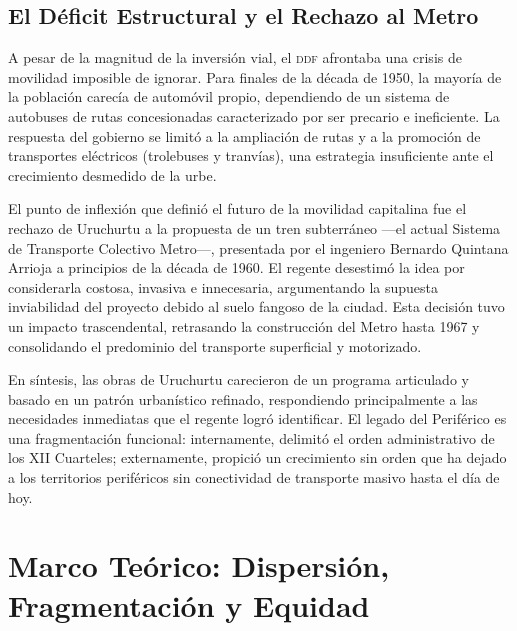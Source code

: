 \subsection{El Déficit Estructural y el Rechazo al Metro}
\label{subsec:rechazo-metro}

A pesar de la magnitud de la inversión vial, el \textsc{ddf} afrontaba una crisis de
movilidad imposible de ignorar. Para finales de la década de 1950, la mayoría de la
población carecía de automóvil propio, dependiendo de un sistema de autobuses de
rutas concesionadas caracterizado por ser precario e ineficiente. La respuesta del
gobierno se limitó a la ampliación de rutas y a la promoción de transportes eléctricos
(trolebuses y tranvías), una estrategia insuficiente ante el crecimiento desmedido
de la urbe.

El punto de inflexión que definió el futuro de la movilidad capitalina fue el rechazo
de Uruchurtu a la propuesta de un tren subterráneo ---el actual Sistema de Transporte
Colectivo Metro---, presentada por el ingeniero Bernardo Quintana Arrioja a principios
de la década de 1960. El regente desestimó la idea por considerarla costosa,
invasiva e innecesaria, argumentando la supuesta inviabilidad del proyecto debido al
suelo fangoso de la ciudad. Esta decisión tuvo un impacto trascendental, retrasando
la construcción del Metro hasta 1967 y consolidando el predominio del transporte
superficial y motorizado.

En síntesis, las obras de Uruchurtu carecieron de un programa articulado y basado
en un patrón urbanístico refinado, respondiendo principalmente a las necesidades
inmediatas que el regente logró identificar. El legado del Periférico es una
fragmentación funcional: internamente, delimitó el orden administrativo de los XII
Cuarteles; externamente, propició un crecimiento sin orden que ha dejado a los
territorios periféricos sin conectividad de transporte masivo hasta el día de hoy.

\section{Marco Teórico: Dispersión, Fragmentación y Equidad}
\label{sec:marco-teorico-dispersion}


